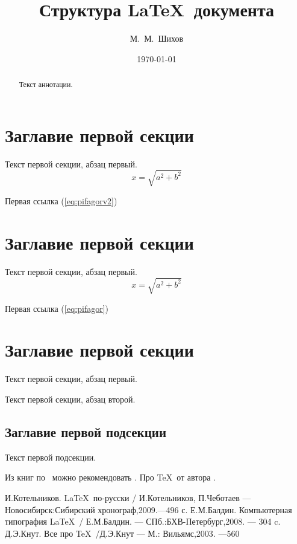 \documentclass{article} %
\title{Структура \LaTeX\ документа} %
\author{М.~М.~Шихов} %
\date{\today} %
\begin{document}
    \maketitle %
    \newpage
    \begin{abstract}
        Текст  аннотации.
    \end{abstract}
    
    \newpage
    \tableofcontents %
    
    \newpage

    \section{Заглавие первой секции}
    Текст первой секции, абзац первый.
    \begin{equation}
        \label{eq:pifagorv2}
        x=\sqrt{a^2+b^2}
    \end{equation}
    
    Первая ссылка (\ref{eq:pifagorv2})
    

    \section{Заглавие первой секции}
    Текст первой секции, абзац первый.
    \begin{equation}
        \label{eq:pifagor}
        x=\sqrt{a^2+b^2}
    \end{equation}
    
    Первая ссылка (\ref{eq:pifagor})
    
    \section{Заглавие первой секции}
    Текст первой секции, абзац первый.
    
    Текст первой секции, абзац второй.
    \subsection{Заглавие первой подсекции}
    Текст первой подсекции.
    
    Из книг по \LaTeXe\ можно рекомендовать \cite{bib:cotelnikov,bib:baldin}. Про \TeX\ от автора \cite{bib:knuth:AllAbout}.
    
    
    \begin{thebibliography}{99}
         И.Котельников. \LaTeX\ по-русски / И.Котельников, П.Чеботаев --- Новосибирск:Сибирский хронограф,2009.---496 с.
         Е.М.Балдин. Компьютерная типография \LaTeX\ / Е.М.Балдин. --- СПб.:БХВ-Петербург,2008. --- 304 c.
        Д.Э.Кнут. Все про \TeX\ /Д.Э.Кнут --- М.: Вильямс,2003. ---560
    \end{thebibliography}
\end{document}
